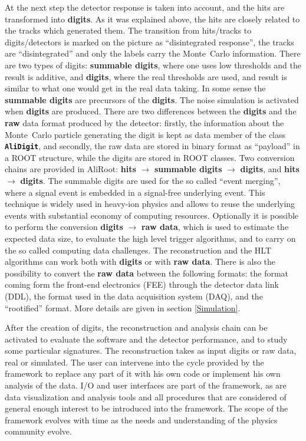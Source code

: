 \documentclass[12pt,a4paper,twoside]{article}
\makeatletter
\newcommand{\class}[1]{\texttt{\textbf{#1}}\xspace}
\newcommand {\MC} {Monte~Carlo\@\xspace}
\makeatother
\begin{document}
At the next step the detector  response is taken into account, and the
hits are transformed into  \textbf{digits}. As it was explained above,
the hits are  closely related to the tracks  which generated them. The
transition  from  hits/tracks to  digits/detectors  is  marked on  the
picture    as    ``disintegrated    response'',   the    tracks    are
``disintegrated''  and  only the  labels  carry  the \MC  information.
There  are two types  of digits:  \textbf{summable digits},  where one
uses  low thresholds  and the  result is  additive, and  {\bf digits},
where the real thresholds are used,  and result is similar to what one
would get  in the real  data taking. In  some sense the  {\bf summable
digits} are precursors of the \textbf{digits}. The noise simulation is
activated when \textbf{digits} are produced. There are two differences
between the \textbf{digits} and  the \textbf{raw} data format produced
by  the detector:  firstly,  the information  about  the \MC  particle
generating  the   digit  is   kept  as  data   member  of   the  class
\class{AliDigit},  and secondly,  the raw  data are  stored  in binary
format as ``payload'' in a ROOT structure, while the digits are stored
in  ROOT  classes. Two  conversion  chains  are  provided in  AliRoot:
\textbf{hits}  $\to$ \textbf{summable  digits}  $\to$ \textbf{digits},
and \textbf{hits} $\to$ \textbf{digits}.  The summable digits are used
for the so called ``event  merging'', where a signal event is embedded
in a  signal-free underlying event.  This technique is widely  used in
heavy-ion  physics and  allows  to reuse  the  underlying events  with
substantial economy of computing resources.  Optionally it is possible
to  perform the  conversion \textbf{digits}  $\to$  \textbf{raw data},
which is used to estimate the expected data size, to evaluate the high
level trigger algorithms, and to carry on the so called computing data
challenges.  The  reconstruction and the HLT algorithms  can work both
with  \textbf{digits} or  with \textbf{raw  data}. There  is  also the
possibility  to convert  the \textbf{raw  data} between  the following
formats:  the  format  coming  form the  front-end  electronics  (FEE)
through  the detector data  link (DDL),  the format  used in  the data
acquisition system  (DAQ), and the ``rootified''  format. More details
are given in section \ref{Simulation}.

After the  creation of digits,  the reconstruction and  analysis chain
can  be   activated  to  evaluate   the  software  and   the  detector
performance,   and   to  study   some   particular  signatures.    The
reconstruction takes as  input digits or raw data,  real or simulated.
The user  can intervene  into the cycle  provided by the  framework to
replace any part of it with his own code or implement his own analysis
of the data. I/O and user interfaces are part of the framework, as are
data  visualization and  analysis tools  and all  procedures  that are
considered  of  general enough  interest  to  be  introduced into  the
framework. The scope  of the framework evolves with  time as the needs
and understanding of the physics community evolve.
\end{document}
